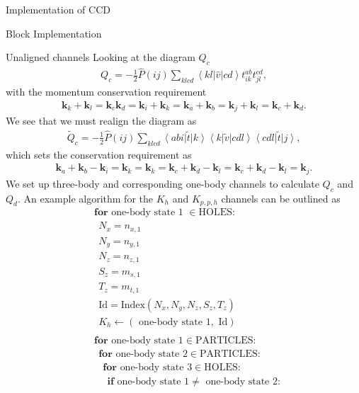 \documentclass[twoside,english]{uiofysmaster}
\begin{document}
\begin{chapter}{Implementation of CCD}
\begin{section}{Block Implementation}
\begin{subsection}{Unaligned channels}
			Looking at the diagram $Q_c$
			\begin{align}
				Q_c = -\frac{1}{2} \hat P(ij) \sum_{klcd} \left<kl|\hat v|cd\right> t_{ik}^{ab} t_{jl}^{cd},
			\end{align}
			with the momentum conservation requirement
			\begin{align}
				\mathbf{k}_k + \mathbf{k}_l = \mathbf{k}_c \mathbf{k}_d = \mathbf{k}_i + \mathbf{k}_k = \mathbf{k}_a + \mathbf{k}_b = \mathbf{k}_j + \mathbf{k}_l = \mathbf{k}_c + \mathbf{k}_d.
			\end{align}
			We see that we must realign the diagram as
			\begin{align}
				\tilde Q_c = -\frac{1}{2} \hat P(ij) \sum_{klcd} \left<abi\right|\tilde t\left|k\right> \left<k\right|\tilde v\left|cdl\right> \left<cdl\right|\tilde t\left|j\right>,
			\end{align}
			which sets the conservation requirement as 
			\begin{align}
				\mathbf{k}_a + \mathbf{k}_b	- \mathbf{k}_i = \mathbf{k}_k = \mathbf{k}_k = \mathbf{k}_c + \mathbf{k}_d - \mathbf{k}_l = \mathbf{k}_c + \mathbf{k}_d - \mathbf{k}_l = \mathbf{k}_j.
			\end{align}
			We set up three-body and corresponding
                        one-body channels to calculate $Q_c$ and
                        $Q_d$. An example algorithm for the $K_h$ and
                        $K_{p,p,h}$ channels can be outlined as
			\begin{align*}
				&\mathbf{for } \text{ one-body state 1 } \in \text{HOLES}:\\
				&\:\: N_x = n_{x,1}\\
				&\:\: N_y = n_{y,1}\\
				&\:\: N_z = n_{z,1}\\
 				&\:\: S_z = m_{s,1}\\
				&\:\: T_z = m_{t,1}\\
				&\:\: \text{Id} = \text{Index}(N_x,N_y,N_z,S_z,T_z) \\
				&\:\: K_h \leftarrow (\text{ one-body state 1}, \text{ Id}) \\ \\ 
				&\mathbf{for } \text{ one-body state 1} \in \text{PARTICLES}: \\
				&\:\: \mathbf{for } \text{ one-body state 2} \in \text{PARTICLES}: \\
				&\:\:\:\: \mathbf{for } \text{ one-body state 3} \in \text{HOLES}: \\
				&\:\:\:\:\:\: \mathbf{if} \text{ one-body state 1} \neq \text{ one-body state 2}: \\

\end{align*}
\end{subsection}
\end{section}
\end{chapter}
\end{document}
